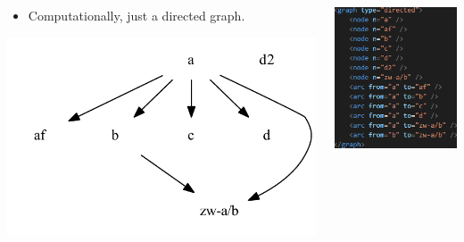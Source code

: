 \documentclass[10pt]{beamer}
\begin{document}
	\begin{frame}
		\begin{columns}
			\begin{column}{0.55\textwidth}
				\begin{itemize}
					\item Computationally, just a directed graph.
				\end{itemize}
				\includegraphics[width=\textwidth]{../img/B25K1V4U22-26-local-stemma-no-legend.pdf}
			\end{column}
			\begin{column}{0.4\textwidth}
				\includegraphics[scale=0.6667]{../img/local-stemma-xml.png}
			\end{column}
		\end{columns}
	\end{frame}
\end{document}
